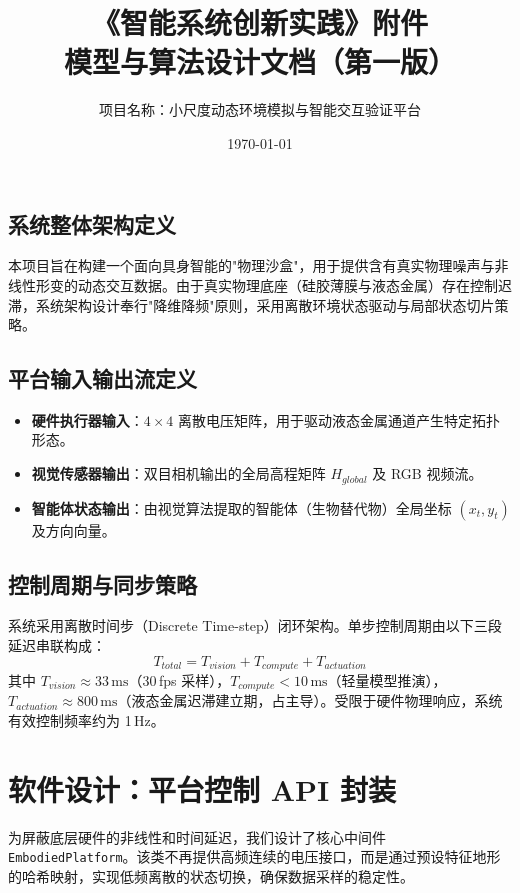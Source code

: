 \documentclass[a4paper,11pt]{ctexart}
\title{\textbf{《智能系统创新实践》附件}\\模型与算法设计文档（第一版）}
\author{项目名称：小尺度动态环境模拟与智能交互验证平台}
\date{\today}
\begin{document}
\maketitle

\begin{samepage}
\section{系统整体架构定义}

本项目旨在构建一个面向具身智能的"物理沙盒"，用于提供含有真实物理噪声与非线性形变的动态交互数据。由于真实物理底座（硅胶薄膜与液态金属）存在控制迟滞，系统架构设计奉行"降维降频"原则，采用离散环境状态驱动与局部状态切片策略。

\subsection{平台输入输出流定义}
\begin{itemize}
    \item \textbf{硬件执行器输入}：$4 \times 4$ 离散电压矩阵，用于驱动液态金属通道产生特定拓扑形态。
    \item \textbf{视觉传感器输出}：双目相机输出的全局高程矩阵 $H_{global}$ 及 RGB 视频流。
    \item \textbf{智能体状态输出}：由视觉算法提取的智能体（生物替代物）全局坐标 $(x_t, y_t)$ 及方向向量。
\end{itemize}

\subsection{控制周期与同步策略}
系统采用离散时间步（Discrete Time-step）闭环架构。单步控制周期由以下三段延迟串联构成：
\begin{equation}
    T_{total} = T_{vision} + T_{compute} + T_{actuation}
\end{equation}
其中 $T_{vision} \approx 33\,\text{ms}$（30\,fps 采样），$T_{compute} < 10\,\text{ms}$（轻量模型推演），$T_{actuation} \approx 800\,\text{ms}$（液态金属迟滞建立期，占主导）。受限于硬件物理响应，系统有效控制频率约为 1\,Hz。
\end{samepage}

\section{软件设计：平台控制 API 封装}

为屏蔽底层硬件的非线性和时间延迟，我们设计了核心中间件 \texttt{EmbodiedPlatform}。该类不再提供高频连续的电压接口，而是通过预设特征地形的哈希映射，实现低频离散的状态切换，确保数据采样的稳定性。
\end{document}
